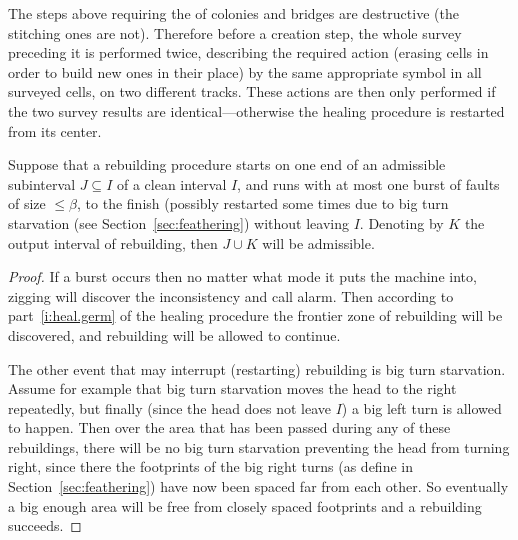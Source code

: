 \documentclass[11pt]{memoir}
\theoremstyle{definition} %
\renewcommand{\le}{\leq}
\def\B{B}
\newcommand{\Tu}{T}
\newcommand{\Tus}{T^{*}}
\begin{document}
The steps above requiring the  of colonies and bridges are destructive
(the stitching ones are not).
Therefore before a creation step, the whole survey preceding it is performed twice, 
describing the required action (erasing cells in order to build new ones in their place)
by the same appropriate symbol in all surveyed cells, on two different tracks.
These actions 
are then only performed if the two survey results are identical---otherwise
the healing procedure is restarted from its center.

\begin{lemma}\label{lem:rebuild-health}
  Suppose that a rebuilding procedure starts on one end of an admissible subinterval
  \( J\subseteq I \) of a clean interval \( I \), and runs with at most one burst of faults
  of size \( \le\beta \), to the finish (possibly restarted
  some times due to big turn starvation (see Section~\ref{sec:feathering}) without leaving \( I \).
  Denoting by \( K \) the output interval of rebuilding, then \( J\cup K \) will be admissible.
\end{lemma}
\begin{proof}
  If a burst occurs then no matter what mode it puts the machine into, 
  zigging will discover the inconsistency and call alarm.
  Then according to part~\eqref{i:heal.germ} of the healing procedure the frontier zone of
  rebuilding will be discovered, and rebuilding will be allowed to continue.

  The other event that may interrupt (restarting) rebuilding is big turn starvation.
  Assume for example that big turn starvation moves the head to the right repeatedly,
  but finally (since the head does not leave \( I \)) a big left turn is allowed to happen.
  Then over the area that has been passed during any of these rebuildings,
  there will be no big turn starvation preventing the head from turning right,
  since there the footprints of the big right turns (as define in Section~\ref{sec:feathering})
  have now been spaced far from each other.
  So eventually a big enough area will be free from closely spaced footprints and a rebuilding succeeds.
\end{proof}


\end{document}
